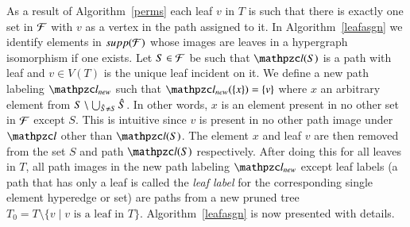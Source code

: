 \documentclass[MS,synopsis]{iitmdiss}
\begin{document}

As a result of Algorithm~\ref{perms} each leaf $v$ in $T$
is such that there is exactly one set in ${\cal F}$ with $v$ as a vertex in
the path assigned to it.  In Algorithm~\ref{leafasgn} we identify
elements in $supp({\cal F})$ whose images are leaves in a hypergraph
isomorphism if one exists.  Let $S \in {\cal F}$ be such that $\cl(S)$ is a
path with leaf and $v \in V(T)$ is the unique leaf incident on it.  We
define a new path labeling $\cl_{new}$ such that $\cl_{new}(\set{x}) =
\set{v}$ where $x$ an arbitrary element from $S \setminus \bigcup_{{\hat S}
  \ne S} {\hat S}$. In other words, $x$ is an element present in no other
set in ${\cal F}$ except $S$. This is intuitive since $v$ is present in no
other path image under $\cl$ other than $\cl(S)$.  The element $x$ and
leaf $v$ are then removed from the set $S$ and path $\cl(S)$
respectively. After doing this for all leaves in $T$, all path images
in the new path labeling $\cl_{new}$ except leaf labels (a path that
has only a leaf is called the {\em leaf label} for the corresponding
single element hyperedge or set) are paths from a new pruned tree $T_0
= T \setminus \{v \mid v \text{ is a leaf in }
T\}$. Algorithm~\ref{leafasgn} is now presented with details.
\end{document}
